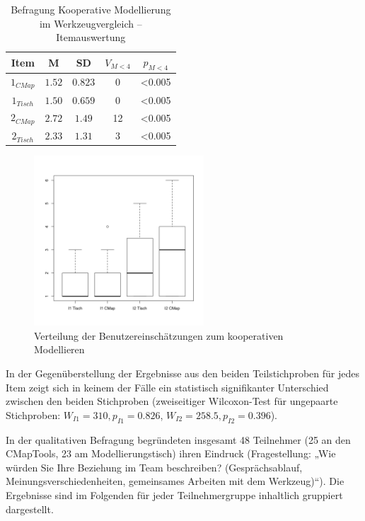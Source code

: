 \begin{table}[htbp]
	\centering
	\caption{Befragung Kooperative Modellierung im Werkzeugvergleich -- Itemauswertung}

\begin{tabular}{| c || c | c || c | c |}
  \hline
   Item & M & SD & $V_{M<4}$ & $p_{M<4}$ \\ \hline
   $1_{CMap}$ & $1.52$ & $0.823$ & 0 & <0.005 \\ 
   $1_{Tisch}$ & $1.50$ & $0.659$ & 0 & <0.005 \\ \hline
   $2_{CMap}$ & $2.72$ & $1.49$ & 12 & <0.005 \\ 
   $2_{Tisch}$ & $2.33$ & $1.31$ & 3 & <0.005 \\ \hline
\end{tabular}
	\label{tab:vergleich_kooperative_modellierung}
\end{table}

\begin{figure}[htbp]
	\centering
		\includegraphics[height=2.5in]{img/Evaluierung/kollaboration_vergleich.png}
	\caption{Verteilung der Benutzereinschätzungen zum kooperativen Modellieren}
	\label{fig:img_Evaluierung_kollaboration_vergleich}
\end{figure}

In der Gegenüberstellung der Ergebnisse aus den beiden Teilstichproben für jedes Item zeigt sich in keinem der Fälle ein statistisch signifikanter Unterschied zwischen den beiden Stichproben (zweiseitiger Wilcoxon-Test für ungepaarte Stichproben: $W_{I1}=310, p_{I1}=0.826$, $W_{I2}=258.5, p_{I2}=0.396$).

In der qualitativen Befragung begründeten insgesamt 48 Teilnehmer (25 an den CMapTools, 23 am Modellierungstisch) ihren Eindruck (Fragestellung: „Wie würden Sie Ihre Beziehung im Team beschreiben? (Gesprächsablauf, Meinungsverschiedenheiten, gemeinsames Arbeiten mit dem Werkzeug)“). Die Ergebnisse sind im Folgenden für jeder Teilnehmergruppe inhaltlich gruppiert dargestellt.

